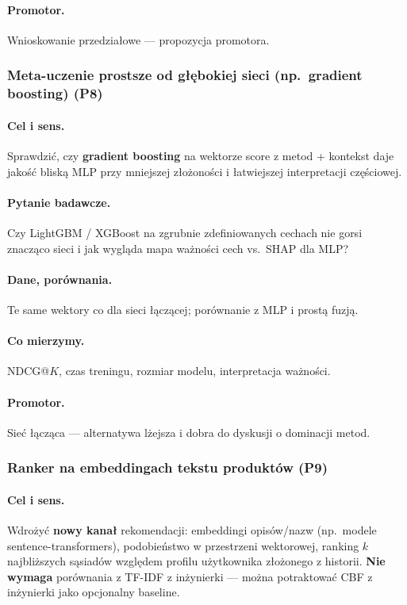 \documentclass[a4paper,11pt]{article}
\begin{document}
\paragraph{Promotor.}
Wnioskowanie przedziałowe --- propozycja promotora.

\subsubsection{Meta-uczenie prostsze od głębokiej sieci (np.\ gradient boosting) (\textbf{P8})}

\paragraph{Cel i sens.}
Sprawdzić, czy \textbf{gradient boosting} na wektorze score z metod + kontekst daje jakość bliską MLP przy mniejszej złożoności i łatwiejszej interpretacji częściowej.

\paragraph{Pytanie badawcze.}
Czy LightGBM / XGBoost na zgrubnie zdefiniowanych cechach nie gorsi znacząco sieci i jak wygląda mapa ważności cech vs.\ SHAP dla MLP?

\paragraph{Dane, porównania.}
Te same wektory co dla sieci łączącej; porównanie z MLP i prostą fuzją.

\paragraph{Co mierzymy.}
NDCG@$K$, czas treningu, rozmiar modelu, interpretacja ważności.

\paragraph{Promotor.}
Sieć łącząca --- alternatywa lżejsza i dobra do dyskusji o dominacji metod.

\subsubsection{Ranker na embeddingach tekstu produktów (\textbf{P9})}

\paragraph{Cel i sens.}
Wdrożyć \textbf{nowy kanał} rekomendacji: embeddingi opisów/nazw (np.\ modele sentence-transformers), podobieństwo w przestrzeni wektorowej, ranking $k$ najbliższych sąsiadów względem profilu użytkownika złożonego z historii. \textbf{Nie wymaga} porównania z TF-IDF z inżynierki --- można potraktować CBF z inżynierki jako opcjonalny baseline.
\end{document}
